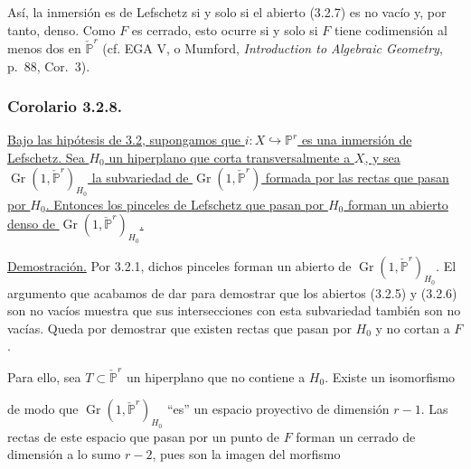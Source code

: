 Así, la inmersión es de Lefschetz si y solo si el abierto (3.2.7) es
no vacío y, por tanto, denso. Como $F$ es cerrado, esto ocurre si y
solo si $F$ tiene codimensión al menos dos en
$\check{\mathbb P}^{r}$ (cf. EGA V, o Mumford,
\emph{Introduction to Algebraic Geometry}, p.~88, Cor.~3).

\subsubsection*{Corolario 3.2.8.}
\underline{Bajo las hipótesis de 3.2, supongamos que
$i:X\hookrightarrow\mathbb P^r$ es una inmersión de Lefschetz. Sea
$H_0$ un hiperplano que corta transversalmente a $X$, y sea
$\operatorname{Gr}(1,\check{\mathbb P}^{r})_{H_0}$ la subvariedad de
$\operatorname{Gr}(1,\check{\mathbb P}^{r})$ formada por las rectas
que pasan por $H_0$. Entonces los pinceles de Lefschetz que pasan por
$H_0$ forman un abierto denso de
$\operatorname{Gr}(1,\check{\mathbb P}^{r})_{H_0}$.}

\noindent\underline{Demostración.}
Por 3.2.1, dichos pinceles forman un abierto de
$\operatorname{Gr}(1,\check{\mathbb P}^{r})_{H_0}$. El argumento que
acabamos de dar para demostrar que los abiertos (3.2.5) y (3.2.6) son
no vacíos muestra que sus intersecciones con esta subvariedad también
son no vacías. Queda por demostrar que existen rectas que pasan por
$H_0$ y no cortan a $F$.

\pageoriginale

Para ello, sea $T\subset\check{\mathbb P}^{r}$ un hiperplano que no
contiene a $H_0$. Existe un isomorfismo
\begin{center}
\end{center}
de modo que $\operatorname{Gr}(1,\check{\mathbb P}^{r})_{H_0}$
``es'' un espacio proyectivo de dimensión $r-1$. Las rectas de este
espacio que pasan por un punto de $F$ forman un cerrado de dimensión a
lo sumo $r-2$, pues son la imagen del morfismo
\begin{center}
\end{center}


